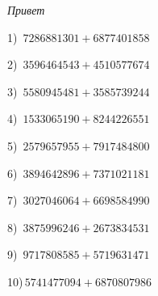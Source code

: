 \documentclass{article}
\begin{document}
 
\begin{center} 
   \large{\textit{Привет}} 
\end{center}\begin{multicols}{2}
1)$\,\,\,7286881301+6877401858$ \par 
2)$\,\,\,3596464543+4510577674$ \par 
3)$\,\,\,5580945481+3585739244$ \par 
4)$\,\,\,1533065190+8244226551$ \par 
5)$\,\,\,2579657955+7917484800$ \par 
6)$\,\,\,3894642896+7371021181$ \par 
7)$\,\,\,3027046064+6698584990$ \par 
8)$\,\,\,3875996246+2673834531$ \par 
9)$\,\,\,9717808585+5719631471$ \par 
10)$\,5741477094+6870807986$ \par 
\end{multicols} 
\end{document}
